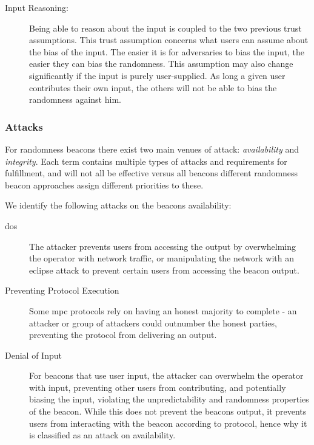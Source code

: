 \begin{description}
    \item [Input Reasoning:]
        Being able to reason about the input is coupled to the two previous trust assumptions. This trust assumption concerns what users can assume about the bias of the input.
        The easier it is for adversaries to bias the input, the easier they can bias the randomness.
        This assumption may also change significantly if the input is purely user-supplied. As long a given user contributes their own input, the others will not be able to bias the randomness against him.



\end{description}


\subsubsection{Attacks}\label{ssub:security_objectives}
For randomness beacons there exist two main venues of attack: \emph{availability} and \emph{integrity}.
Each term contains multiple types of attacks and requirements for fulfillment, and will not all be effective versus all beacons different randomness beacon approaches assign different priorities to these.

We identify the following attacks on the beacons availability:

\begin{description}
    \item [ \acrfull{dos}] The attacker prevents users from accessing the output by overwhelming the operator with network traffic, or manipulating the network with an eclipse attack to prevent certain users from accessing the beacon output.
    \item [ Preventing Protocol Execution ] Some \gls{mpc} protocols rely on having an honest majority to complete - an attacker or group of attackers could outnumber the honest parties, preventing the protocol from delivering an output.
    \item [ Denial of Input ] For beacons that use user input, the attacker can overwhelm the operator with input, preventing other users from contributing, and potentially biasing the input, violating the unpredictability and randomness properties of the beacon. While this does not prevent the beacons output, it prevents users from interacting with the beacon according to protocol, hence why it is classified as an attack on availability.
\end{description}


